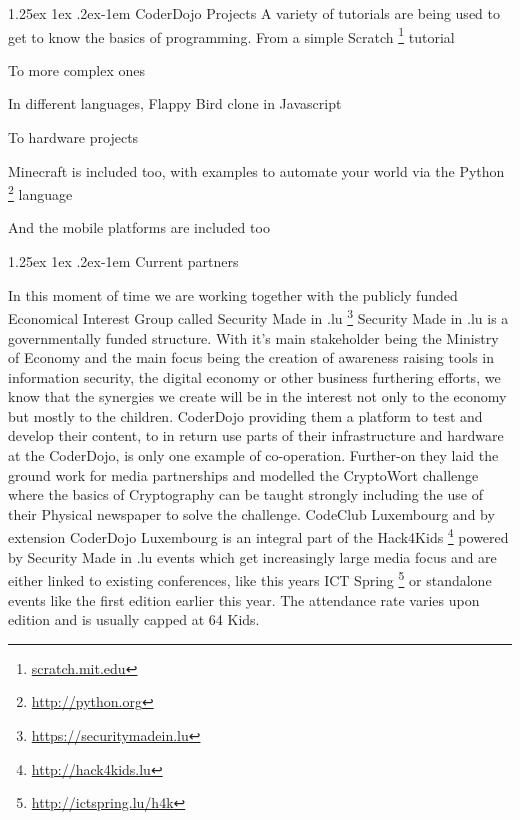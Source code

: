 \documentclass{proposal}
\makeatletter
\renewcommand{\paragraph}{
  \@startsection{paragraph}{4}
    {\z@}{1.25ex \@plus 1ex \@minus .2ex}{-1em}
      {\normalfont\normalsize\bfseries}
      }
\makeatother
\begin{document}
\paragraph{CoderDojo Projects}
A variety of tutorials are being used to  get to know the basics of programming. From a simple Scratch \footnote{\url{scratch.mit.edu}} tutorial

To more complex ones


In different languages, Flappy Bird clone in Javascript


To hardware projects


Minecraft is included too, with examples to automate your world via the Python \footnote{\url{http://python.org}} language


And the mobile platforms are included too


\newpage

\paragraph{Current partners}

In this moment of time we are working together with the publicly funded Economical Interest Group called Security Made in .lu \footnote{\url{https://securitymadein.lu}}
Security Made in .lu is a governmentally funded structure. With it's main stakeholder being the Ministry of Economy and the main focus being the creation of awareness raising tools in information security, the digital economy or other business furthering efforts, we know that the synergies we create will be in the interest not only to the economy but mostly to the children.
CoderDojo providing them a platform to test and develop their content, to in return use parts of their infrastructure and hardware at the CoderDojo, is only one example of co-operation.
Further-on they laid the ground work for media partnerships and modelled the CryptoWort challenge where the basics of Cryptography can be taught strongly including the use of their Physical newspaper to solve the challenge.
CodeClub Luxembourg and by extension CoderDojo Luxembourg is an integral part of the Hack4Kids \footnote{\url{http://hack4kids.lu}} powered by Security Made in .lu events which get increasingly large media focus and are either linked to existing conferences, like this years ICT Spring \footnote{\url{http://ictspring.lu/h4k}} or standalone events like the first edition earlier this year. The attendance rate varies upon edition and is usually capped at 64 Kids.
\end{document}
